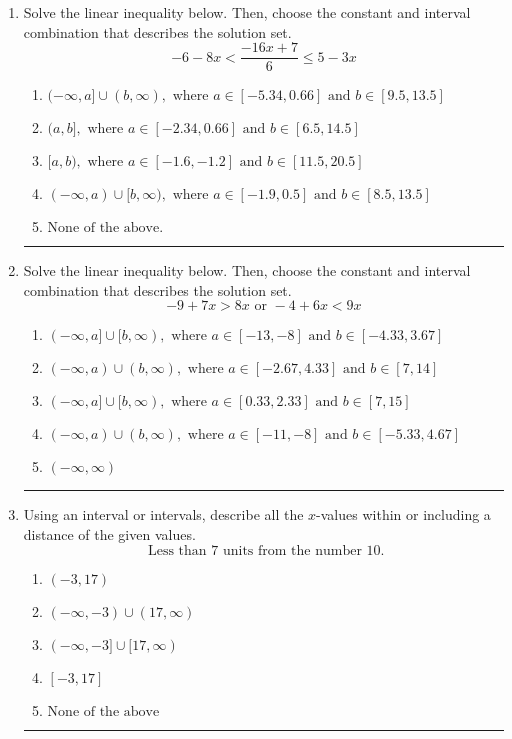 \documentclass[14pt]{extbook}
\newcommand{\litem}[1]{\item#1\hspace*{-1cm}\rule{\textwidth}{0.4pt}}
\begin{document}
\begin{enumerate}
{\begin{enumerate}[label=\Alph*.]
\end{enumerate} }
\litem{
Solve the linear inequality below. Then, choose the constant and interval combination that describes the solution set.\[ -6 - 8 x < \frac{-16 x + 7}{6} \leq 5 - 3 x \]\begin{enumerate}[label=\Alph*.]
\item \( (-\infty, a] \cup (b, \infty), \text{ where } a \in [-5.34, 0.66] \text{ and } b \in [9.5, 13.5] \)
\item \( (a, b], \text{ where } a \in [-2.34, 0.66] \text{ and } b \in [6.5, 14.5] \)
\item \( [a, b), \text{ where } a \in [-1.6, -1.2] \text{ and } b \in [11.5, 20.5] \)
\item \( (-\infty, a) \cup [b, \infty), \text{ where } a \in [-1.9, 0.5] \text{ and } b \in [8.5, 13.5] \)
\item \( \text{None of the above.} \)

\end{enumerate} }
\litem{
Solve the linear inequality below. Then, choose the constant and interval combination that describes the solution set.\[ -9 + 7 x > 8 x \text{ or } -4 + 6 x < 9 x \]\begin{enumerate}[label=\Alph*.]
\item \( (-\infty, a] \cup [b, \infty), \text{ where } a \in [-13, -8] \text{ and } b \in [-4.33, 3.67] \)
\item \( (-\infty, a) \cup (b, \infty), \text{ where } a \in [-2.67, 4.33] \text{ and } b \in [7, 14] \)
\item \( (-\infty, a] \cup [b, \infty), \text{ where } a \in [0.33, 2.33] \text{ and } b \in [7, 15] \)
\item \( (-\infty, a) \cup (b, \infty), \text{ where } a \in [-11, -8] \text{ and } b \in [-5.33, 4.67] \)
\item \( (-\infty, \infty) \)

\end{enumerate} }
\litem{
Using an interval or intervals, describe all the $x$-values within or including a distance of the given values.\[ \text{ Less than } 7 \text{ units from the number } 10. \]\begin{enumerate}[label=\Alph*.]
\item \( (-3, 17) \)
\item \( (-\infty, -3) \cup (17, \infty) \)
\item \( (-\infty, -3] \cup [17, \infty) \)
\item \( [-3, 17] \)
\item \( \text{None of the above} \)


\end{enumerate}}
\end{enumerate}
\end{document}
